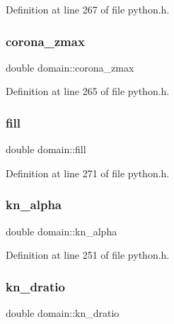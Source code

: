 Definition at line 267 of file python.\+h.

\mbox{\label{structdomain_aa07f5672067b05bf3608b27afe02b747}} 
\subsubsection{\texorpdfstring{corona\+\_\+zmax}{corona\_zmax}}
{\footnotesize\ttfamily double domain\+::corona\+\_\+zmax}



Definition at line 265 of file python.\+h.

\mbox{\label{structdomain_af919432b7fbe13685cae0fcbc98f4e8f}} 
\subsubsection{\texorpdfstring{fill}{fill}}
{\footnotesize\ttfamily double domain\+::fill}



Definition at line 271 of file python.\+h.

\mbox{\label{structdomain_a3b98872ee3fe1e81d1ebcc0e58b9493b}} 
\subsubsection{\texorpdfstring{kn\+\_\+alpha}{kn\_alpha}}
{\footnotesize\ttfamily double domain\+::kn\+\_\+alpha}



Definition at line 251 of file python.\+h.

\mbox{\label{structdomain_a545d794eb6978b47b263f8cd5ebd851b}} 
\subsubsection{\texorpdfstring{kn\+\_\+dratio}{kn\_dratio}}
{\footnotesize\ttfamily double domain\+::kn\+\_\+dratio}



